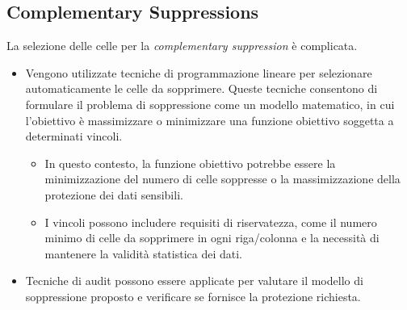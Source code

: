 \documentclass{report}
\begin{document}
\subsection{Complementary Suppressions}
La selezione delle celle per la \textit{complementary suppression} è complicata. 
\begin{itemize}
    \item Vengono utilizzate tecniche di programmazione lineare per selezionare automaticamente le celle da sopprimere. Queste tecniche consentono di formulare il problema di soppressione come un modello matematico, in cui l'obiettivo è massimizzare o minimizzare una funzione obiettivo soggetta a determinati vincoli.
    \begin{itemize}
        \item In questo contesto, la funzione obiettivo potrebbe essere la minimizzazione del numero di celle soppresse o la massimizzazione della protezione dei dati sensibili.
        \item I vincoli possono includere requisiti di riservatezza, come il numero minimo di celle da sopprimere in ogni riga/colonna e la necessità di mantenere la validità statistica dei dati.
    \end{itemize}
    \item Tecniche di audit possono essere applicate per valutare il modello di soppressione proposto e verificare se fornisce la protezione richiesta.
\end{itemize}
\end{document}
